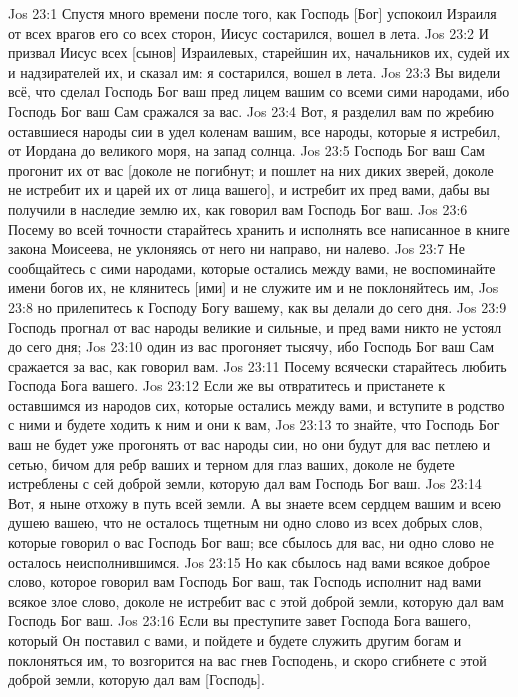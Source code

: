 \vs Jos 23:1 Спустя много времени после того, как Господь [Бог] успокоил Израиля от всех врагов его со всех сторон, Иисус состарился, вошел в  лета.
\vs Jos 23:2 И призвал Иисус всех [сынов] Израилевых, старейшин их, начальников их, судей их и надзирателей их, и сказал им: я состарился, вошел в  лета.
\vs Jos 23:3 Вы видели всё, что сделал Господь Бог ваш пред лицем вашим со всеми сими народами, ибо Господь Бог ваш Сам сражался за вас.
\vs Jos 23:4 Вот, я разделил вам по жребию оставшиеся народы сии в удел коленам вашим, все народы, которые я истребил, от Иордана до великого моря, на запад солнца.
\vs Jos 23:5 Господь Бог ваш Сам прогонит их от вас [доколе не погибнут; и пошлет на них диких зверей, доколе не истребит их и царей их от лица вашего], и истребит их пред вами, дабы вы получили в наследие землю их, как говорил вам Господь Бог ваш.
\vs Jos 23:6 Посему во всей точности старайтесь хранить и исполнять все написанное в книге закона Моисеева, не уклоняясь от него ни направо, ни налево.
\vs Jos 23:7 Не сообщайтесь с сими народами, которые остались между вами, не воспоминайте имени богов их, не клянитесь [ими] и не служите им и не поклоняйтесь им,
\vs Jos 23:8 но прилепитесь к Господу Богу вашему, как вы делали до сего дня.
\vs Jos 23:9 Господь прогнал от вас народы великие и сильные, и пред вами никто не устоял до сего дня;
\vs Jos 23:10 один из вас прогоняет тысячу, ибо Господь Бог ваш Сам сражается за вас, как говорил вам.
\vs Jos 23:11 Посему всячески старайтесь любить Господа Бога вашего.
\vs Jos 23:12 Если же вы отвратитесь и пристанете к оставшимся из народов сих, которые остались между вами, и вступите в родство с ними и будете ходить к ним и они к вам,
\vs Jos 23:13 то знайте, что Господь Бог ваш не будет уже прогонять от вас народы сии, но они будут для вас петлею и сетью, бичом для ребр ваших и терном для глаз ваших, доколе не будете истреблены с сей доброй земли, которую дал вам Господь Бог ваш.
\vs Jos 23:14 Вот, я ныне отхожу в путь всей земли. А вы знаете всем сердцем вашим и всею душею вашею, что не осталось тщетным ни одно слово из всех добрых слов, которые говорил о вас Господь Бог ваш; все сбылось для вас, ни одно слово не осталось неисполнившимся.
\vs Jos 23:15 Но как сбылось над вами всякое доброе слово, которое говорил вам Господь Бог ваш, так Господь исполнит над вами всякое злое слово, доколе не истребит вас с этой доброй земли, которую дал вам Господь Бог ваш.
\vs Jos 23:16 Если вы преступите завет Господа Бога вашего, который Он поставил с вами, и пойдете и будете служить другим богам и поклоняться им, то возгорится на вас гнев Господень, и скоро сгибнете с этой доброй земли, которую дал вам [Господь].
